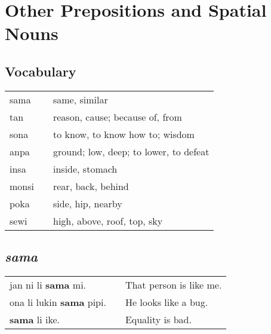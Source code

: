 \section{Other Prepositions and Spatial Nouns}
\subsection*{Vocabulary}
%
\begin{supertabular}{p{5,5cm}|ll}
sama && same, similar \\
tan && reason, cause; because of, from \\
sona && to know, to know how to; wisdom \\
anpa && ground; low, deep; to lower, to defeat \\ 
insa && inside, stomach \\
monsi && rear, back, behind \\
poka && side, hip, nearby \\
sewi && high, above, roof, top, sky \\
\end{supertabular} 
%
\subsection*{\textit{sama}}
%
\begin{supertabular}{p{5,5cm}|ll}
jan ni li \textbf{sama} mi. && That person is like me. \\
ona li lukin \textbf{sama} pipi. && He looks like a bug. \\
\textbf{sama} li ike. && Equality is bad. \\
\end{supertabular} 
%
